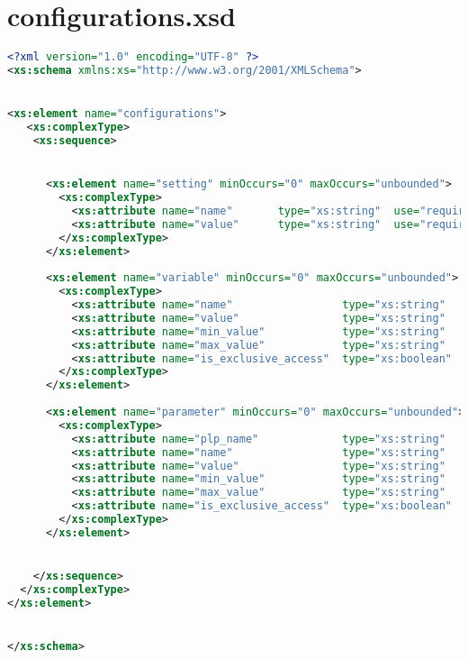 \section{  configurations.xsd}\label{Appendix_2_1} 
\begin{lstlisting}[style=stylexml,language=XML]
<?xml version="1.0" encoding="UTF-8" ?>
<xs:schema xmlns:xs="http://www.w3.org/2001/XMLSchema">


<xs:element name="configurations">
   <xs:complexType>
    <xs:sequence>


      <xs:element name="setting" minOccurs="0" maxOccurs="unbounded">
        <xs:complexType>
          <xs:attribute name="name"       type="xs:string"  use="required"/>
          <xs:attribute name="value"      type="xs:string"  use="required"/>
        </xs:complexType>
      </xs:element>
            
      <xs:element name="variable" minOccurs="0" maxOccurs="unbounded">
        <xs:complexType>
          <xs:attribute name="name"                 type="xs:string"    use="required"/>
          <xs:attribute name="value"                type="xs:string"    use="required" />
          <xs:attribute name="min_value"            type="xs:string"    use="optional"/>
          <xs:attribute name="max_value"            type="xs:string"    use="optional"/>
          <xs:attribute name="is_exclusive_access"  type="xs:boolean"   use="optional"/>
        </xs:complexType>
      </xs:element>
            
      <xs:element name="parameter" minOccurs="0" maxOccurs="unbounded">
        <xs:complexType>
          <xs:attribute name="plp_name"             type="xs:string"    use="required"/>
          <xs:attribute name="name"                 type="xs:string"    use="required"/>
          <xs:attribute name="value"                type="xs:string"    use="required" />
          <xs:attribute name="min_value"            type="xs:string"    use="optional"/>
          <xs:attribute name="max_value"            type="xs:string"    use="optional"/>
          <xs:attribute name="is_exclusive_access"  type="xs:boolean"   use="optional"/>
        </xs:complexType>
      </xs:element>


    </xs:sequence>
  </xs:complexType>
</xs:element>


</xs:schema>
	\end{lstlisting}
